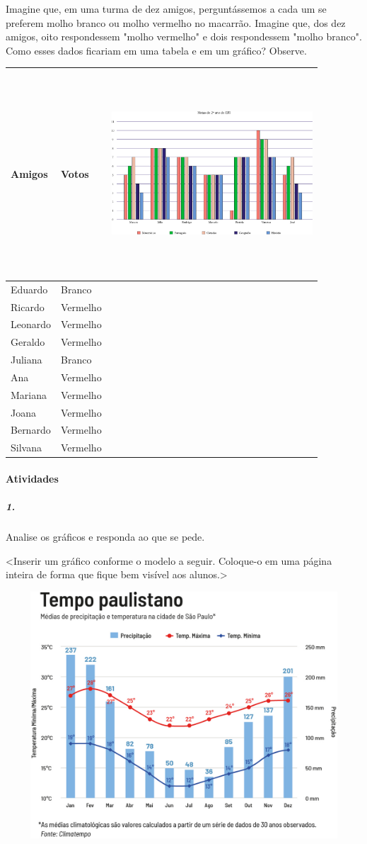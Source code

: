 Imagine que, em uma turma de dez amigos, perguntássemos a cada um se
preferem molho branco ou molho vermelho no macarrão. Imagine que, dos dez amigos,
oito respondessem "molho vermelho" e dois respondessem "molho branco". Como
esses dados ficariam em uma tabela e em um gráfico? Observe.

\begin{longtable}[]{@{}lll@{}}
\toprule
Amigos & Votos &
\includegraphics[width=2.95833in,height=3.00000in]{media/image90.png}\tabularnewline
\midrule
\endhead
Eduardo & Branco &\tabularnewline
Ricardo & Vermelho &\tabularnewline
Leonardo & Vermelho &\tabularnewline
Geraldo & Vermelho &\tabularnewline
Juliana & Branco &\tabularnewline
Ana & Vermelho &\tabularnewline
Mariana & Vermelho &\tabularnewline
Joana & Vermelho &\tabularnewline
Bernardo & Vermelho &\tabularnewline
Silvana & Vermelho &\tabularnewline
\bottomrule
\end{longtable}

\paragraph{Atividades }\label{atividades-6}

\subparagraph{1.}\label{section-78}

Analise os gráficos e responda ao que se pede.

\textless{}Inserir um gráfico conforme o modelo a seguir. Coloque-o em
uma página inteira de forma que fique bem visível aos
alunos.\textgreater{}

\includegraphics[width=7.80208in,height=3.62472in]{media/image91.png}

